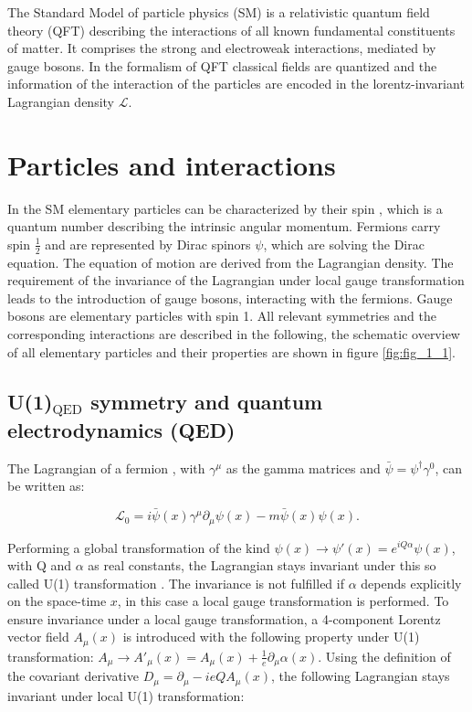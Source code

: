 The Standard Model of particle physics (\gls{SM}) \cite{SM} is a relativistic quantum field theory (QFT) describing the interactions of all known fundamental constituents of matter. It comprises the strong and electroweak interactions, mediated by gauge bosons.  In the formalism of \gls{QFT} classical fields are quantized and the information of the interaction of the particles are encoded in the lorentz-invariant Lagrangian density $\mathcal{L}$. 


\section{Particles and interactions}
\label{sec:section_1_1}

In the \gls{SM} elementary particles can be characterized by their spin \cite{SPIN}, which is a quantum number describing the intrinsic angular momentum. Fermions carry spin $\frac{1}{2}$ and are represented by Dirac spinors $\psi$, which are solving the Dirac equation. The equation of motion are derived from the Lagrangian density. The requirement of the invariance of the Lagrangian under local gauge transformation leads to the introduction of gauge bosons, interacting with the fermions. Gauge bosons are elementary particles with spin 1. All relevant symmetries and the corresponding interactions are described in the following, the schematic overview of all elementary particles and their properties are shown in figure \ref{fig:fig_1_1}.

\subsection{U(1)${_{\text{QED}}}$ symmetry and quantum electrodynamics (\gls{QED})}
\label{sec:section_1_1_1}

The Lagrangian of a fermion \cite{Peskin}, with $\gamma^{\mu}$ as the gamma matrices and $\bar{\psi} = \psi^{\dagger}\gamma^{0}$, can be written as:

\begin{equation}
	\label{eq:eq_1_1}
	\mathcal{L}_{0} =  i\bar{\psi}(x)\gamma^{\mu}\partial_{\mu}\psi(x) - m\bar{\psi}(x)\psi(x).
\end{equation}

Performing a global transformation of the kind $\psi(x) \rightarrow \psi'(x) = e^{iQ\alpha}\psi(x)$, with Q and $\alpha$ as real constants, the Lagrangian stays invariant under this so called U(1) transformation \cite{SM}. The invariance is not fulfilled if $\alpha$ depends explicitly on the space-time $x$, in this case a local gauge transformation is performed. To ensure invariance under a local gauge transformation, a 4-component Lorentz vector field $A_{\mu}(x)$ is introduced with the following property under U(1) transformation: $A_{\mu} \rightarrow A'_{\mu}(x) = A_{\mu}(x) + \frac{1}{e}\partial_{\mu}\alpha(x)$. Using the definition of the covariant derivative $D_{\mu} = \partial_{\mu} - ieQA_{\mu}(x)$, the following Lagrangian stays invariant under local U(1) transformation:

